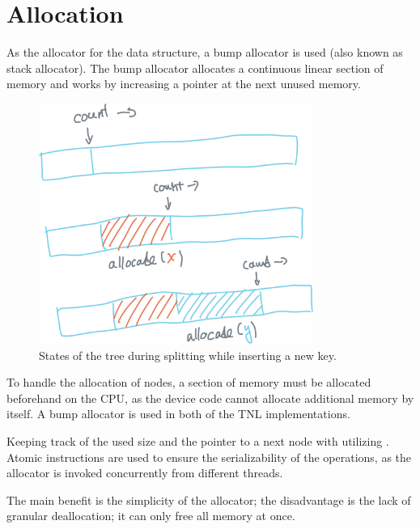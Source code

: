 \section{Allocation}

As the allocator for the data structure, a bump allocator is used (also known as stack allocator). The bump allocator allocates a continuous linear section of memory and works by increasing a pointer at the next unused memory.

\begin{figure}[H]
  \centering
  \includegraphics[width=0.8\textwidth ]{components/figure/bump-allocator}
  \caption{States of the tree during splitting while inserting a new key.}
  \label{figure:bump-allocator}
\end{figure}

To handle the allocation of nodes, a section of memory must be allocated beforehand on the CPU, as the device code cannot allocate additional memory by itself. A bump allocator is used in both of the TNL implementations.

Keeping track of the used size and the pointer to a next node with utilizing . Atomic instructions are used to ensure the serializability of the operations, as the allocator is invoked concurrently from different threads.

The main benefit is the simplicity of the allocator; the disadvantage is the lack of granular deallocation; it can only free all memory at once.
